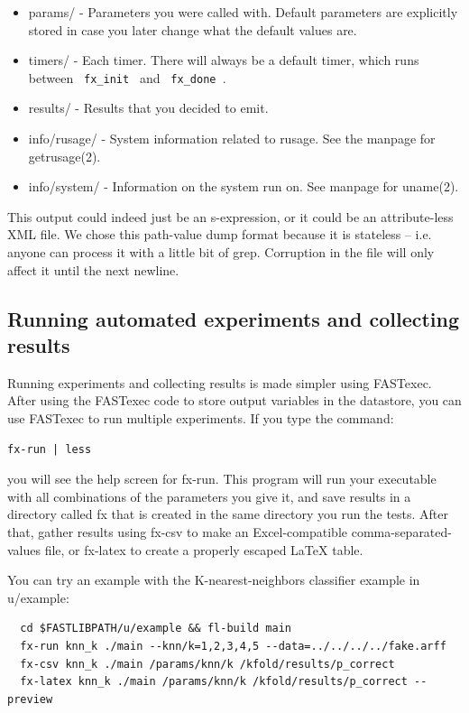 \documentclass[letter]{report}
\begin{document}
\begin{itemize}
\item params/ - Parameters you were called with. Default parameters are explicitly stored in case you later change what the default values are.
\item timers/ - Each timer. There will always be a default timer, which runs between \verb= fx_init = and \verb= fx_done =.
\item results/ - Results that you decided to emit.
\item info/rusage/ - System information related to rusage. See the manpage for getrusage(2).
\item info/system/ - Information on the system run on. See manpage for uname(2). 
\end{itemize}
This output could indeed just be an s-expression, or it could be an attribute-less XML file. We chose this path-value dump format because it is stateless -- i.e. anyone can process it with a little bit of grep. Corruption in the file will only affect it until the next newline.

\subsection{Running automated experiments and collecting results}

Running experiments and collecting results is made simpler using FASTexec. After using the FASTexec code to store output variables in the datastore, you can use FASTexec to run multiple experiments. If you type the command:
\begin{verbatim}
fx-run | less
\end{verbatim}
you will see the help screen for fx-run. This program will run your executable with all combinations of the parameters you give it, and save results in a directory called fx that is created in the same directory you run the tests. After that, gather results using fx-csv to make an Excel-compatible comma-separated-values file, or fx-latex to create a properly escaped LaTeX table.

You can try an example with the K-nearest-neighbors classifier example in u/example:
\begin{verbatim}
  cd $FASTLIBPATH/u/example && fl-build main
  fx-run knn_k ./main --knn/k=1,2,3,4,5 --data=../../../../fake.arff
  fx-csv knn_k ./main /params/knn/k /kfold/results/p_correct
  fx-latex knn_k ./main /params/knn/k /kfold/results/p_correct --preview
\end{verbatim}
\end{document}
